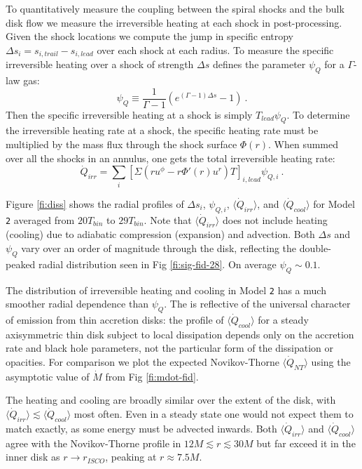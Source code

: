 \documentclass{emulateapj}
\newcommand{\Gam}{\Gamma}
\newcommand{\De}{\Delta}
\newcommand{\model}[1]{{Model \texttt{#1}}}
\newcommand{\avet}[1]{ \langle #1 \rangle}
\begin{document}
To quantitatively measure the coupling between the spiral shocks and the bulk disk flow we measure the irreversible heating at each shock in post-processing.  Given the shock locations we compute the jump in specific entropy $\Delta s_i = s_{i,trail} - s_{i,lead}$ over each shock at each radius.  To measure the specific irreversible heating over a shock of strength $\De s$ \cite{Rafikov16} defines the parameter $\psi_Q$ for a $\Gam$-law gas:
\begin{equation}
	\psi_Q \equiv \frac{1}{\Gam - 1} \left( e^{(\Gam -1)\De s } - 1 \right) \ . \label{eq:def-psi}
\end{equation}
Then the specific irreversible heating at a shock is simply $T_{lead} \psi_Q$.  To determine the irreversible heating rate at a shock, the specific heating rate must be multiplied by the mass flux through the shock surface $\Phi(r)$.  When summed over all the shocks in an annulus, one gets the total irreversible heating rate:
\begin{equation}
	\dot{Q}_{irr} = \sum_i \left[ \Sigma \left(r u^\phi - r \Phi'(r) u^r \right) T \right]_{i,lead} \psi_{Q,i} \ . \label{eq:QirrRaf}
\end{equation}

Figure \ref{fi:diss} shows the radial profiles of $\Delta s_i$, $\psi_{Q,i}$, $\avet{\dot{Q}_{irr}}$, and $\avet{\dot{Q}_{cool}}$ for \model{2} averaged from $20 T_{bin}$ to $29 T_{bin}$.  Note that $\avet{\dot{Q}_{irr}}$ does not include heating (cooling) due to adiabatic compression (expansion) and advection.  Both $\De s$ and $\psi_Q$ vary over an order of magnitude through the disk, reflecting the double-peaked radial distribution seen in Fig \ref{fi:sig-fid-28}. On average $\psi_Q \sim 0.1$.  

The distribution of irreversible heating and cooling in \model{2} has a much smoother radial dependence than $\psi_Q$. The is reflective of the universal character of emission from thin accretion disks: the profile of $\avet{\dot{Q}_{cool}}$ for a steady axisymmetric thin disk subject to local dissipation depends only on the accretion rate and black hole parameters, not the particular form of the dissipation or opacities.  For comparison we plot the expected Novikov-Thorne $\avet{\dot{Q}_{NT}}$ using the asymptotic value of $\dot{M}$ from Fig \ref{fi:mdot-fid}. 

The heating and cooling are broadly similar over the extent of the disk, with $\avet{\dot{Q}_{irr}} \lesssim \avet{\dot{Q}_{cool}}$ most often.  Even in a steady state one would not expect them to match exactly, as some energy must be advected inwards.  Both $\avet{\dot{Q}_{irr}}$ and $\avet{\dot{Q}_{cool}}$ agree with the Novikov-Thorne profile in $12 M \lesssim r \lesssim 30M$ but far exceed it in the inner disk as $r \to r_{ISCO}$, peaking at $r \approx 7.5M$.
\end{document}
